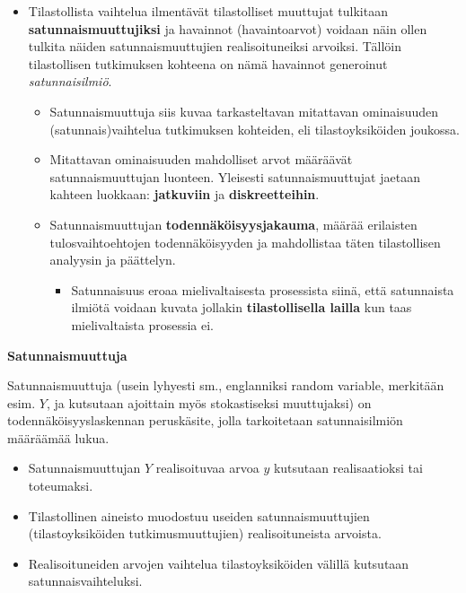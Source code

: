 \documentclass[
]{book}
\providecommand{\tightlist}{%
  \setlength{\itemsep}{0pt}\setlength{\parskip}{0pt}}
\begin{document}
\begin{itemize}
\tightlist
\item
  Tilastollista vaihtelua ilmentävät tilastolliset muuttujat tulkitaan \textbf{satunnaismuuttujiksi} ja havainnot (havaintoarvot) voidaan näin ollen tulkita näiden satunnaismuuttujien realisoituneiksi arvoiksi. Tällöin tilastollisen tutkimuksen kohteena on nämä havainnot generoinut \emph{satunnaisilmiö}.

  \begin{itemize}
  \tightlist
  \item
    Satunnaismuuttuja siis kuvaa tarkasteltavan mitattavan ominaisuuden (satunnais)vaihtelua tutkimuksen kohteiden, eli tilastoyksiköiden joukossa.
  \item
    Mitattavan ominaisuuden mahdolliset arvot määräävät satunnaismuuttujan luonteen. Yleisesti satunnaismuuttujat jaetaan kahteen luokkaan: \textbf{jatkuviin} ja \textbf{diskreetteihin}.
  \item
    Satunnaismuuttujan \textbf{todennäköisyysjakauma}, määrää erilaisten tulosvaihtoehtojen todennäköisyyden ja mahdollistaa täten tilastollisen analyysin ja päättelyn.

    \begin{itemize}
    \tightlist
    \item
      Satunnaisuus eroaa mielivaltaisesta prosessista siinä, että satunnaista ilmiötä voidaan kuvata jollakin \textbf{tilastollisella lailla} kun taas mielivaltaista prosessia ei.
    \end{itemize}
  \end{itemize}
\end{itemize}

\begin{defblock}{}

\textbf{Satunnaismuuttuja}

Satunnaismuuttuja (usein lyhyesti sm., englanniksi random variable, merkitään esim. \(Y\), ja kutsutaan ajoittain myös stokastiseksi muuttujaksi) on todennäköisyyslaskennan peruskäsite, jolla tarkoitetaan satunnaisilmiön määräämää lukua.

\begin{itemize}
\item
  Satunnaismuuttujan \(Y\) realisoituvaa arvoa \(y\) kutsutaan realisaatioksi tai toteumaksi.
\item
  Tilastollinen aineisto muodostuu useiden satunnaismuuttujien (tilastoyksiköiden tutkimusmuuttujien) realisoituneista arvoista.
\item
  Realisoituneiden arvojen vaihtelua tilastoyksiköiden välillä kutsutaan satunnaisvaihteluksi.\\
\end{itemize}

\end{defblock}
\end{document}
